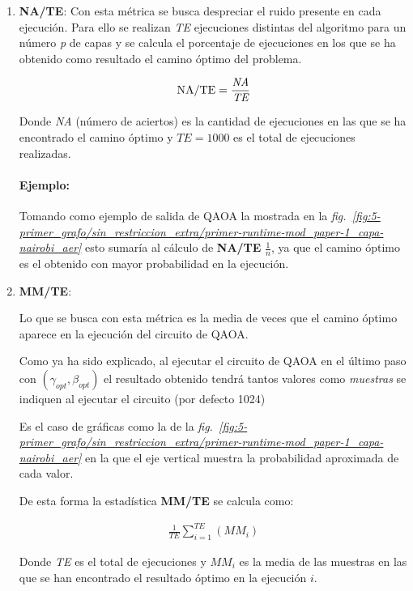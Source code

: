 \begin{enumerate}
\item \textbf{NA/TE}:
  Con esta métrica se busca despreciar el ruido presente en cada ejecución.
  Para ello se realizan \textit{TE} ejecuciones distintas del algoritmo para un número \textit{p} de capas y se calcula el porcentaje de ejecuciones en los que se ha obtenido como resultado el camino óptimo del problema.

  \begin{align}
    \textnormal{NA/TE} = \frac{\textit{NA}}{\textit{TE}}
  \end{align}

  Donde \textit{NA} (número de aciertos) es la cantidad de ejecuciones en las que se ha encontrado el camino óptimo y $\textit{TE} = 1000$ es el total de ejecuciones realizadas.

  \paragraph{Ejemplo:}
  Tomando como ejemplo de salida de QAOA la mostrada en la \textit{fig.~\ref{fig:5-primer_grafo/sin_restriccion_extra/primer-runtime-mod_paper-1_capa-nairobi_aer}} esto sumaría al cálculo de \textbf{NA/TE} $\frac{1}{n}$, ya que el camino óptimo es el obtenido con mayor probabilidad en la ejecución.
  
\item \textbf{MM/TE}:

  Lo que se busca con esta métrica es la media de veces que el camino óptimo aparece en la ejecución del circuito de QAOA\@.

  Como ya ha sido explicado, al ejecutar el circuito de QAOA en el último paso con $(\gamma_{opt}, \beta_{opt})$ el resultado obtenido tendrá tantos valores como \textit{muestras} se indiquen al ejecutar el circuito (por defecto 1024)

  Es el caso de gráficas como la de la \textit{fig.~\ref{fig:5-primer_grafo/sin_restriccion_extra/primer-runtime-mod_paper-1_capa-nairobi_aer}}
  en la que el eje vertical muestra la probabilidad aproximada de cada valor.

  De esta forma la estadística \textbf{MM/TE} se calcula como:

  \begin{align}
    \frac{1}{\textit{TE}} \sum_{i = 1}^\textit{TE} (\textit{MM}_i)
  \end{align}

  Donde \textit{TE} es el total de ejecuciones y $\textit{MM}_i$ es la media de las muestras en las que se han encontrado el resultado óptimo en la ejecución $i$.


\end{enumerate}
